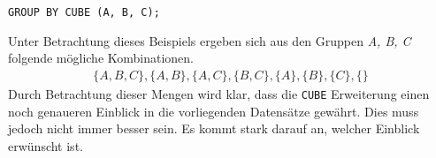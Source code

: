 \texttt{GROUP BY CUBE (A, B, C);}

Unter Betrachtung dieses Beispiels ergeben sich aus den Gruppen \textit{A, B, C}
folgende mögliche Kombinationen.
\begin{align*}
	\{ A, B, C\}, \{A, B\}, \{A, C\}, \{B, C\}, \{A\}, \{B\}, \{C\}, \{ \}
\end{align*}
Durch Betrachtung dieser Mengen wird klar, dass die \texttt{CUBE} Erweiterung
einen noch genaueren Einblick in die vorliegenden Datensätze gewährt. Dies muss jedoch
nicht immer besser sein. Es kommt stark darauf an, welcher Einblick erwünscht ist.

